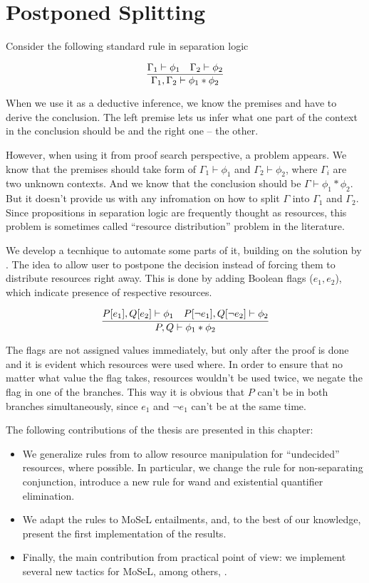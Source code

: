 \chapter{Postponed Splitting}
\label{chap:postponed_splitting}
Consider the following standard rule in separation logic

\[\infer{\Gamma_1, \Gamma_2 \vdash \phi_1 \ast \phi_2}
        {\Gamma_1 \vdash \phi_1 &
         \Gamma_2 \vdash \phi_2} \]

When we use it as a deductive inference, we know the premises and have to derive the conclusion.
The left premise lets us infer what one part of the context in the conclusion should be and the right one -- the other.

However, when using it from proof search perspective, a problem appears.
We know that the premises should take form of \(\Gamma_1 \vdash \phi_1\) and \(\Gamma_2 \vdash \phi_2\), where $\Gamma_i$ are two unknown contexts.
And we know that the conclusion should be \(\Gamma \vdash \phi_1 \ast \phi_2\).
But it doesn't provide us with any infromation on how to split \(\Gamma\) into \(\Gamma_1\) and \(\Gamma_2\).
Since propositions in separation logic are frequently thought as resources, this problem is sometimes called ``resource distribution'' problem in the literature.

We develop a tecnhique to automate some parts of it, building on the solution by \citet{harlandResourceDistributionBooleanConstraints2003}.
The idea to allow user to postpone the decision instead of forcing them to distribute resources right away.
This is done by adding Boolean flags (\(e_1, e_2\)), which indicate presence of respective resources.

\[
  \infer{P, Q \vdash \phi_1 \ast \phi_2}
        {P[e_1], Q[e_2] \vdash \phi_1 &
          P[\neg {e}_1], Q[\neg {e}_2] \vdash \phi_2}
\]

The flags are not assigned values immediately, but only after the proof is done and it is evident which resources were used where.
In order to ensure that no matter what value the flag takes, resources wouldn't be used twice, we negate the flag in one of the branches.
This way it is obvious that \(P\) can't be in both branches simultaneously, since \(e_1\) and \(\neg {e}_1\) can't be \true at the same time.

The following contributions of the thesis are presented in this chapter:
\begin{itemize}
\item We generalize rules from \citet{harlandResourceDistributionBooleanConstraints2003} to allow resource manipulation for ``undecided'' resources, where possible.
  In particular, we change the rule for non-separating conjunction, introduce a new rule for wand and existential quantifier elimination.
\item We adapt the rules to MoSeL entailments, and, to the best of our knowledge, present the first implementation of the results.
\item Finally, the main contribution from practical point of view: we implement several new tactics for MoSeL, among others, .
\end{itemize}


